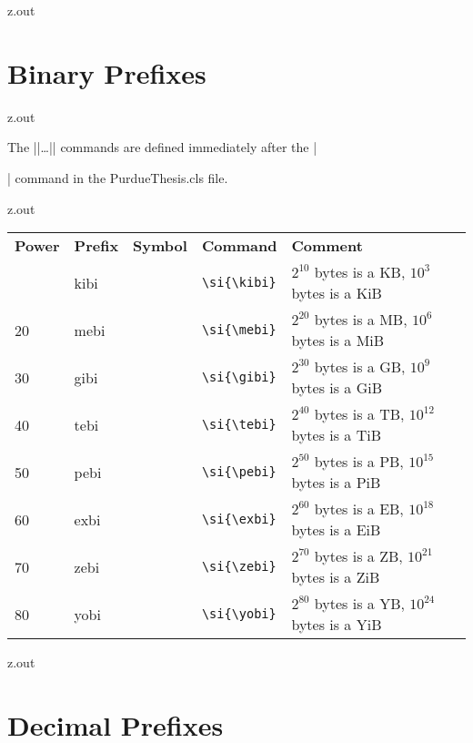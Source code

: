 \MyIO


\begin{VerbatimOut}{z.out}

\section{Binary Prefixes}
\end{VerbatimOut}

\MyIO


\begin{VerbatimOut}{z.out}

The
|\kibi|\ldots|\yobi|
commands are defined immediately after the
|\usepackage{siunitx}|
command in the PurdueThesis.cls file.
\end{VerbatimOut}

\MyIO


\begin{VerbatimOut}{z.out}

\renewcommand{\t}[4]{\(2^{#1}\) bytes is a #2, \(10^{#3}\) bytes is a #4}
\begin{tabular}{@{}mllll@{}}
  \multicolumn{1}{l}{\bfseries Power}&
    \bfseries Prefix&
    \bfseries Symbol&
    \bfseries Command&
    \bfseries Comment\\
  \tabularspace
  10& kibi& \unit{\kibi\nounit}& \verb+\si{\kibi}+& \t{10}{KB}{3}{KiB}\\
  20& mebi& \unit{\mebi\nounit}& \verb+\si{\mebi}+& \t{20}{MB}{6}{MiB}\\
  30& gibi& \unit{\gibi\nounit}& \verb+\si{\gibi}+& \t{30}{GB}{9}{GiB}\\
  40& tebi& \unit{\tebi\nounit}& \verb+\si{\tebi}+& \t{40}{TB}{12}{TiB}\\
  50& pebi& \unit{\pebi\nounit}& \verb+\si{\pebi}+& \t{50}{PB}{15}{PiB}\\
  60& exbi& \unit{\exbi\nounit}& \verb+\si{\exbi}+& \t{60}{EB}{18}{EiB}\\
  70& zebi& \unit{\zebi\nounit}& \verb+\si{\zebi}+& \t{70}{ZB}{21}{ZiB}\\
  80& yobi& \unit{\yobi\nounit}& \verb+\si{\yobi}+& \t{80}{YB}{24}{YiB}\\
\end{tabular}
\end{VerbatimOut}

\MyIO


\begin{VerbatimOut}{z.out}

\section{Decimal Prefixes}
\end{VerbatimOut}


